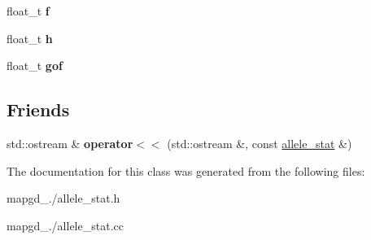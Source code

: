 \begin{DoxyCompactItemize}
\item 
\hypertarget{classallele__stat_a4541dd92614e9f3f58b3014d1af957f6}{float\-\_\-t {\bfseries f}}\label{classallele__stat_a4541dd92614e9f3f58b3014d1af957f6}

\item 
\hypertarget{classallele__stat_abbe9258202898fce4f1e2331feb1ad3d}{float\-\_\-t {\bfseries h}}\label{classallele__stat_abbe9258202898fce4f1e2331feb1ad3d}

\item 
\hypertarget{classallele__stat_a84c271c57a619f6ea3e520f44e446361}{float\-\_\-t {\bfseries gof}}\label{classallele__stat_a84c271c57a619f6ea3e520f44e446361}

\end{DoxyCompactItemize}
\subsection*{Friends}
\begin{DoxyCompactItemize}
\item 
\hypertarget{classallele__stat_a3b57c3b3704522365fb3d4901af810e9}{std\-::ostream \& {\bfseries operator$<$$<$} (std\-::ostream \&, const \hyperlink{classallele__stat}{allele\-\_\-stat} \&)}\label{classallele__stat_a3b57c3b3704522365fb3d4901af810e9}

\end{DoxyCompactItemize}


The documentation for this class was generated from the following files\-:\begin{DoxyCompactItemize}
\item 
mapgd\-\_./allele\-\_\-stat.\-h\item 
mapgd\-\_./allele\-\_\-stat.\-cc\end{DoxyCompactItemize}
